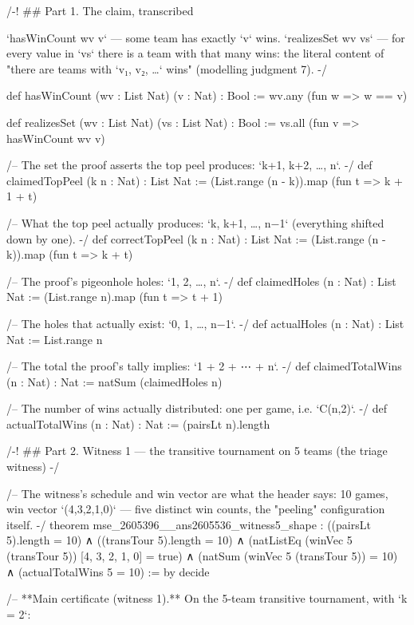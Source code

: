 \documentclass[11pt]{article}
\begin{document}
\begin{Vlean}
/-! ## Part 1. The claim, transcribed

`hasWinCount wv v` — some team has exactly `v` wins.
`realizesSet wv vs` — for every value in `vs` there is a team with that many wins:
the literal content of "there are teams with `v₁, v₂, …` wins" (modelling judgment 7). -/

def hasWinCount (wv : List Nat) (v : Nat) : Bool := wv.any (fun w => w == v)

def realizesSet (wv : List Nat) (vs : List Nat) : Bool := vs.all (fun v => hasWinCount wv v)

/-- The set the proof asserts the top peel produces: `{k+1, k+2, …, n}`. -/
def claimedTopPeel (k n : Nat) : List Nat := (List.range (n - k)).map (fun t => k + 1 + t)

/-- What the top peel actually produces: `{k, k+1, …, n−1}` (everything shifted down by one). -/
def correctTopPeel (k n : Nat) : List Nat := (List.range (n - k)).map (fun t => k + t)

/-- The proof's pigeonhole holes: `{1, 2, …, n}`. -/
def claimedHoles (n : Nat) : List Nat := (List.range n).map (fun t => t + 1)

/-- The holes that actually exist: `{0, 1, …, n−1}`. -/
def actualHoles (n : Nat) : List Nat := List.range n

/-- The total the proof's tally implies: `1 + 2 + ⋯ + n`. -/
def claimedTotalWins (n : Nat) : Nat := natSum (claimedHoles n)

/-- The number of wins actually distributed: one per game, i.e. `C(n,2)`. -/
def actualTotalWins (n : Nat) : Nat := (pairsLt n).length

/-! ## Part 2. Witness 1 — the transitive tournament on 5 teams (the triage witness) -/

/-- The witness's schedule and win vector are what the header says: 10 games, win vector
`(4,3,2,1,0)` — five distinct win counts, the "peeling" configuration itself. -/
theorem mse_2605396__ans2605536_witness5_shape :
    ((pairsLt 5).length = 10)
  ∧ ((transTour 5).length = 10)
  ∧ (natListEq (winVec 5 (transTour 5)) [4, 3, 2, 1, 0] = true)
  ∧ (natSum (winVec 5 (transTour 5)) = 10)
  ∧ (actualTotalWins 5 = 10) := by decide

/-- **Main certificate (witness 1).**  On the 5-team transitive tournament, with `k = 2`:


\end{Vlean}
\end{document}
